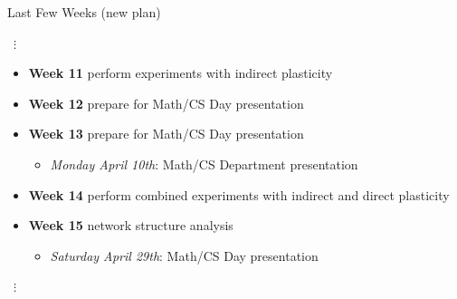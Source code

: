 \begin{frame}{Last Few Weeks (new plan)}
\begin{center}
{\centering ~$\bm{\vdots}$~}
\end{center}
\begin{itemize}
  \item \textbf{Week 11} perform experiments with indirect plasticity
  \item \textbf{Week 12} prepare for Math/CS Day presentation
  \item \textbf{Week 13} prepare for Math/CS Day presentation
  \begin{itemize}
    \item \textit{Monday April 10th}: Math/CS Department presentation
  \end{itemize}
  \item \textbf{Week 14} perform combined experiments with indirect and direct plasticity
  \item \textbf{Week 15} network structure analysis
  \begin{itemize}
  	\item \textit{Saturday April 29th}: Math/CS Day presentation
  \end{itemize}
 \end{itemize}
\vspace{-1ex}
\begin{center}
{\centering ~$\bm{\vdots}$~}
\end{center}
\end{frame}